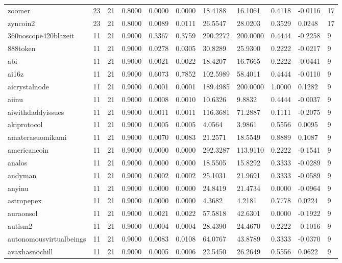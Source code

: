 \begin{table}[htbp]
\begin{tabular}{lllllllllll}
zoomer & 23 & 21 & 0.8000 & 0.0000 & 0.0000 & 18.4188 & 16.1061 & 0.4118 & -0.0116 & 17 \\
zyncoin2 & 23 & 21 & 0.8000 & 0.0089 & 0.0111 & 26.5547 & 28.0203 & 0.3529 & 0.0248 & 17 \\
360noscope420blazeit & 11 & 21 & 0.9000 & 0.3367 & 0.3759 & 290.2272 & 200.0000 & 0.4444 & -0.2258 & 9 \\
888token & 11 & 21 & 0.9000 & 0.0278 & 0.0305 & 30.8289 & 25.9300 & 0.2222 & -0.0217 & 9 \\
abi & 11 & 21 & 0.9000 & 0.0021 & 0.0022 & 18.4207 & 16.7665 & 0.2222 & -0.0441 & 9 \\
ai16z & 11 & 21 & 0.9000 & 0.6073 & 0.7852 & 102.5989 & 58.4011 & 0.4444 & -0.0110 & 9 \\
aicrystalnode & 11 & 21 & 0.9000 & 0.0001 & 0.0001 & 189.4985 & 200.0000 & 1.0000 & 0.1282 & 9 \\
aiinu & 11 & 21 & 0.9000 & 0.0008 & 0.0010 & 10.6326 & 9.8832 & 0.4444 & -0.0037 & 9 \\
aiwithdaddyissues & 11 & 21 & 0.9000 & 0.0011 & 0.0011 & 116.3681 & 71.2887 & 0.1111 & -0.2075 & 9 \\
akiprotocol & 11 & 21 & 0.9000 & 0.0005 & 0.0005 & 4.0564 & 3.9861 & 0.5556 & 0.0095 & 9 \\
amaterasuomikami & 11 & 21 & 0.9000 & 0.0070 & 0.0083 & 21.2571 & 18.5549 & 0.8889 & 0.1087 & 9 \\
americancoin & 11 & 21 & 0.9000 & 0.0000 & 0.0000 & 292.3287 & 113.9110 & 0.2222 & -0.1541 & 9 \\
analos & 11 & 21 & 0.9000 & 0.0000 & 0.0000 & 18.5505 & 15.8292 & 0.3333 & -0.0289 & 9 \\
andyman & 11 & 21 & 0.9000 & 0.0002 & 0.0002 & 25.1031 & 21.9691 & 0.3333 & -0.0589 & 9 \\
anyinu & 11 & 21 & 0.9000 & 0.0000 & 0.0000 & 24.8419 & 21.4734 & 0.0000 & -0.0964 & 9 \\
astropepex & 11 & 21 & 0.9000 & 0.0000 & 0.0000 & 4.3682 & 4.2181 & 0.7778 & 0.0224 & 9 \\
auraonsol & 11 & 21 & 0.9000 & 0.0021 & 0.0022 & 57.5818 & 42.6301 & 0.0000 & -0.1922 & 9 \\
autism2 & 11 & 21 & 0.9000 & 0.0004 & 0.0004 & 28.4390 & 24.4670 & 0.2222 & -0.1016 & 9 \\
autonomousvirtualbeings & 11 & 21 & 0.9000 & 0.0083 & 0.0108 & 64.0767 & 43.8789 & 0.3333 & -0.0370 & 9 \\
avaxhasnochill & 11 & 21 & 0.9000 & 0.0005 & 0.0006 & 22.5450 & 26.2649 & 0.5556 & 0.0622 & 9 \\

\end{tabular}
\end{table}
